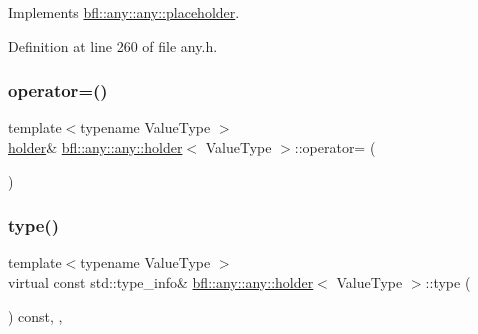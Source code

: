 Implements \mbox{\hyperlink{classbfl_1_1any_1_1any_1_1placeholder_a6dba5b12e7e4a4247f03cfdb762a3f58}{bfl\+::any\+::any\+::placeholder}}.



Definition at line 260 of file any.\+h.

\mbox{\label{classbfl_1_1any_1_1any_1_1holder_abf9b67dde9f72c79d391e2fe886084dd}} 
\subsubsection{\texorpdfstring{operator=()}{operator=()}}
{\footnotesize\ttfamily template$<$typename Value\+Type $>$ \\
\mbox{\hyperlink{classbfl_1_1any_1_1any_1_1holder}{holder}}\& \mbox{\hyperlink{classbfl_1_1any_1_1any_1_1holder}{bfl\+::any\+::any\+::holder}}$<$ Value\+Type $>$\+::operator= (\begin{DoxyParamCaption}\item[{const \mbox{\hyperlink{classbfl_1_1any_1_1any_1_1holder}{holder}}$<$ Value\+Type $>$ \&}]{ }\end{DoxyParamCaption})\hspace{0.3cm}{\ttfamily [private]}}

\mbox{\label{classbfl_1_1any_1_1any_1_1holder_a833f70296a6481da9f7d3e0e4d3120ae}} 
\subsubsection{\texorpdfstring{type()}{type()}}
{\footnotesize\ttfamily template$<$typename Value\+Type $>$ \\
virtual const std\+::type\+\_\+info\& \mbox{\hyperlink{classbfl_1_1any_1_1any_1_1holder}{bfl\+::any\+::any\+::holder}}$<$ Value\+Type $>$\+::type (\begin{DoxyParamCaption}{ }\end{DoxyParamCaption}) const\hspace{0.3cm}{\ttfamily [inline]}, {\ttfamily [virtual]}, {\ttfamily [noexcept]}}



